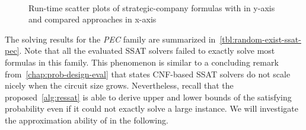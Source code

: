 \begin{figure}[hp]
    \centering
    \\
    \caption{Run-time scatter plots of strategic-company formulas with \ressat in y-axis and compared approaches in x-axis}
    \label{fig:ressat-scatter-strategic}
\end{figure}

The solving results for the \textit{PEC} family are summarized in~\cref{tbl:random-exist-ssat-pec}.
Note that all the evaluated SSAT solvers failed to exactly solve most formulas in this family.
This phenomenon is similar to a concluding remark from~\cref{chap:prob-design-eval}
that states CNF-based SSAT solvers do not scale nicely when the circuit size grows.
Nevertheless, recall that the proposed~\cref{alg:ressat} is able to derive upper and lower bounds
of the satisfying probability even if it could not exactly solve a large instance.
We will investigate the approximation ability of \ressat in the following.

